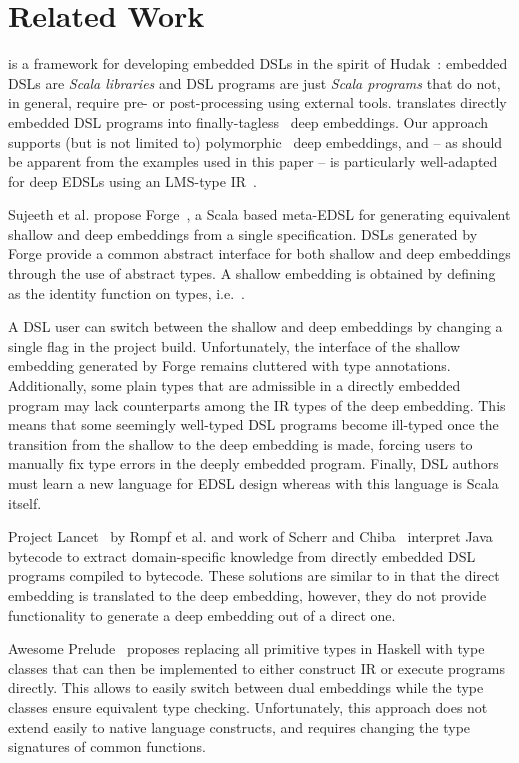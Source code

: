 \section{Related Work}
\label{sec:related-work}

\yy is a framework for developing embedded DSLs in the spirit of
Hudak~\cite{Hudak96csur,Hudak98sr}: embedded DSLs are \emph{Scala
  libraries} and DSL programs are just \emph{Scala programs} that do
not, in general, require pre- or post-processing using external tools.
\yy translates directly embedded DSL programs into
finally-tagless~\cite{carette_finally_2009} deep embeddings.  Our
approach supports (but is not limited to)
polymorphic~\cite{hofer_polymorphic_2008} deep embeddings, and -- as
should be apparent from the examples used in this paper -- is
particularly well-adapted for deep EDSLs using an LMS-type
IR~\cite{rompf_scala-virtualized:_2009,rompf_optimizing_2013}.


Sujeeth et al. propose Forge~\cite{forge}, a Scala based meta-EDSL for generating equivalent
shallow and deep embeddings from a single specification.  DSLs
generated by Forge provide a common abstract interface for both
shallow and deep embeddings through the use of abstract 
types.  A shallow embedding is obtained by defining  as the
identity function on types, i.e.\ .


A DSL user can switch between the shallow and deep embeddings by
changing a single flag in the project build. Unfortunately, the interface of the shallow
embedding generated by Forge remains cluttered with  type
annotations. Additionally, some plain types that are admissible in a
directly embedded program may lack counterparts among the IR types of
the deep embedding.  This means that some seemingly well-typed DSL
programs become ill-typed once the transition from the shallow to the
deep embedding is made, forcing users to manually fix type errors in
the deeply embedded program. Finally, DSL authors must learn a new
language for EDSL design whereas with \yy this language is Scala
itself.

Project Lancet~\cite{lancet} by Rompf et al. and work of Scherr and
Chiba~\cite{scherr_ecoop_2014} interpret Java bytecode to extract
domain-specific knowledge from directly embedded
DSL programs compiled to bytecode. These solutions are similar to \yy
in that the direct embedding is translated to the deep
embedding, however, they do not provide functionality to
generate a deep embedding out of a direct one.

Awesome Prelude~\cite{awesome} proposes replacing all primitive types
in Haskell with type classes that can then be implemented to either
construct IR or execute programs directly. This allows to easily
switch between dual embeddings while the type classes ensure
equivalent type checking.  Unfortunately, this approach does not
extend easily to native language constructs, and requires changing the
type signatures of common functions.

